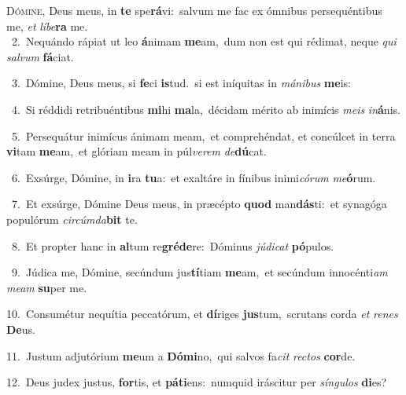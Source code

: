 \lettrine{\initial\textcolor{\initialcolor}{D}}{ómine,} Deus meus, in \textbf{te} spe\-\textbf{rá}\-vi:~\star salvum me fac ex ómnibus persequéntibus me, \textit{et} \textit{lí}\-\textit{be}\textbf{ra} me.\\
{\numbfont\textcolor{\numbcolor}{~2.}}~Nequándo rápiat ut leo \textbf{á}\-nimam \textbf{me}\-am,~\star dum non est qui rédimat, neque \textit{qui} \textit{sal}\-\textit{vum} \textbf{fá}\-ciat.\par
{\numbfont\textcolor{\numbcolor}{~3.}}~Dómine, Deus meus, si \textbf{fe}\-ci \textbf{is}\-tud.~\star si est iníquitas in \textit{má}\-\textit{ni}\textit{bus} \textbf{me}\-is:\par
{\numbfont\textcolor{\numbcolor}{~4.}}~Si réddidi retribuéntibus \textbf{mi}\-hi \textbf{ma}\-la,~\star décidam mérito ab inimícis \textit{me}\-\textit{is} \textit{in}\-\textbf{á}nis.\par
{\numbfont\textcolor{\numbcolor}{~5.}}~Persequátur inimícus ánimam meam,~\dagger et comprehéndat, et concúlcet in terra \textbf{vi}\-tam \textbf{me}\-am,~\star et glóriam meam in púl\-\textit{ve}\-\textit{rem} \textit{de}\-\textbf{dú}cat.\par
{\numbfont\textcolor{\numbcolor}{~6.}}~Exsúrge, Dómine, in \textbf{i}\-ra \textbf{tu}\-a:~\star et exaltáre in fínibus inimi\-\textit{có}\-\textit{rum} \textit{me}\-\textbf{ó}rum.\par
{\numbfont\textcolor{\numbcolor}{~7.}}~Et exsúrge, Dómine Deus meus, in præcépto \textbf{quod} man\-\textbf{dás}\-ti:~\star et synagóga populórum \textit{cir}\-\textit{cúm}\textit{da}\textbf{bit} te.\par
{\numbfont\textcolor{\numbcolor}{~8.}}~Et propter hanc in \textbf{al}\-tum re\-\textbf{gré}\-\textbf{de}re:~\star Dóminus \textit{jú}\-\textit{di}\textit{cat} \textbf{pó}\-pulos.\par
{\numbfont\textcolor{\numbcolor}{~9.}}~Júdica me, Dómine, secúndum jus\-\textbf{tí}\-tiam \textbf{me}\-am,~\star et secúndum innocénti\textit{am} \textit{me}\-\textit{am} \textbf{su}\-per me.\par
{\numbfont\textcolor{\numbcolor}{10.}}~Consumétur nequítia peccatórum, et \textbf{dí}\-riges \textbf{jus}\-tum,~\star scrutans corda \textit{et} \textit{re}\-\textit{nes} \textbf{De}\-us.\par
{\numbfont\textcolor{\numbcolor}{11.}}~Justum adjutórium \textbf{me}\-um a \textbf{Dó}\-\textbf{mi}no,~\star qui salvos fa\textit{cit} \textit{rec}\-\textit{tos} \textbf{cor}\-de.\par
{\numbfont\textcolor{\numbcolor}{12.}}~Deus judex justus, \textbf{for}\-tis, et \textbf{pá}\-\textbf{ti}ens:~\star numquid iráscitur per \textit{sín}\-\textit{gu}\textit{los} \textbf{di}\-es?\par
